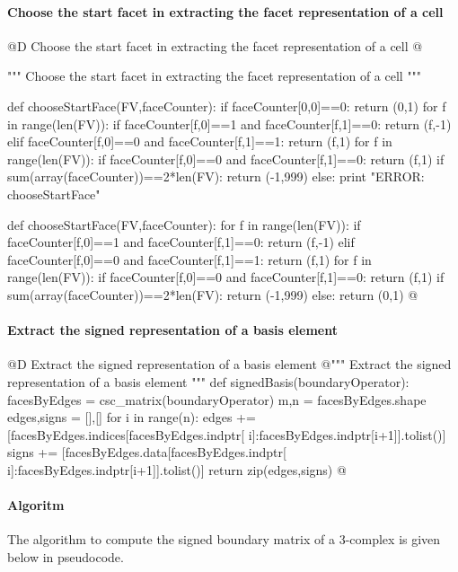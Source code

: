 \documentclass[11pt,oneside]{article}    %
\begin{document}
\paragraph{Choose the start facet in extracting the facet representation of a cell}
@D Choose the start facet in extracting the facet representation of a cell
@{""" Choose the start facet in extracting the facet representation of a cell """

def chooseStartFace(FV,faceCounter):
    if faceCounter[0,0]==0: return (0,1)
    for f in range(len(FV)):
        if faceCounter[f,0]==1 and faceCounter[f,1]==0: return (f,-1)
        elif faceCounter[f,0]==0 and faceCounter[f,1]==1: return (f,1)
    for f in range(len(FV)):
        if faceCounter[f,0]==0 and faceCounter[f,1]==0: return (f,1)
    if sum(array(faceCounter))==2*len(FV): return (-1,999)
    else: print "ERROR: chooseStartFace"

def chooseStartFace(FV,faceCounter):
    for f in range(len(FV)):
        if faceCounter[f,0]==1 and faceCounter[f,1]==0: return (f,-1)
        elif faceCounter[f,0]==0 and faceCounter[f,1]==1: return (f,1)
    for f in range(len(FV)):
        if faceCounter[f,0]==0 and faceCounter[f,1]==0: return (f,1)
    if sum(array(faceCounter))==2*len(FV): return (-1,999)
    else: return (0,1)
@}



\paragraph{Extract the signed representation of a basis element}
@D Extract the signed representation of a basis element
@{""" Extract the signed representation of a basis element """
def signedBasis(boundaryOperator):
    facesByEdges = csc_matrix(boundaryOperator)
    m,n = facesByEdges.shape
    edges,signs = [],[]
    for i in range(n):
        edges += [facesByEdges.indices[facesByEdges.indptr[
                              i]:facesByEdges.indptr[i+1]].tolist()]
        signs += [facesByEdges.data[facesByEdges.indptr[
                              i]:facesByEdges.indptr[i+1]].tolist()]
    return zip(edges,signs)
@}


\paragraph{Algoritm} 
The algorithm to compute the signed boundary matrix of a 3-complex is given below in pseudocode.
\end{document}
